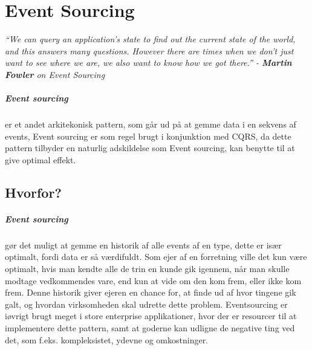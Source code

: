 \chapter{Event Sourcing}

\textit{``We can query an application's state to find out the current state of the world, and this answers many questions. However there are times when we don't just want to see where we are, we also want to know how we got there.'' - \textbf{Martin Fowler} on Event Sourcing}

\paragraph{Event sourcing}
  
er et andet arkitekonisk pattern, som går ud på at gemme data i en sekvens af events, Event sourcing er som regel brugt i konjunktion med CQRS, da dette pattern tilbyder en naturlig adskildelse som Event sourcing, kan benytte til at give optimal effekt.

\section{Hvorfor?}

\paragraph{Event sourcing} gør det muligt at gemme en historik af alle events af en type, dette er især optimalt, fordi data er så værdifuldt. Som ejer af en forretning ville det kun være optimalt, hvis man kendte alle de trin en kunde gik igennem, når man skulle modtage vedkommendes vare, end kun at vide om den kom frem, eller ikke kom frem. Denne historik giver ejeren en chance for, at finde ud af hvor tingene gik galt, og hvordan virksomheden skal udrette dette problem. Eventsourcing er iøvrigt brugt meget i store enterprise applikationer, hvor der er resourcer til at implementere dette pattern, samt at goderne kan udligne de negative ting ved det, som f.eks. kompleksistet, ydevne og omkostninger.

